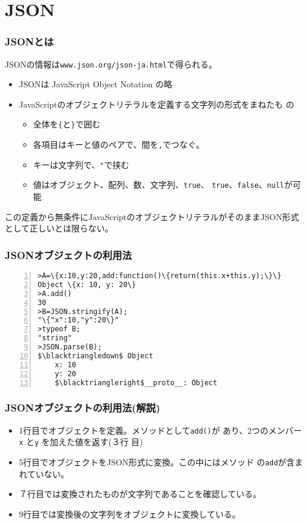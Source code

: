 
\renewcommand{\theFancyVerbLine}{\footnotesize\arabic{FancyVerbLine}}

\frame{\maketitle}
\section{JSON}
\begin{frame}[containsverbatim]
 \frametitle{JSONとは}
 JSONの情報は\texttt{www.json.org/json-ja.html}で得られる。
 \begin{itemize}
  \item  JSONは JavaScript Object Notation の略
  \item JavaScriptのオブジェクトリテラルを定義する文字列の形式をまねたも
				の
				\begin{itemize}
				 \item 全体を\texttt{\{}と\texttt{\}}で囲む
				 \item 各項目はキーと値のペアで、間を\texttt{,}でつなぐ。
				 \item キーは文字列で、\texttt{"}で挟む%
				 \item 値はオブジェクト、配列、数、文字列、\texttt{true}、
							 \texttt{true}、\texttt{false}、\texttt{null}が可能
				\end{itemize}
 \end{itemize}
 この定義から無条件にJavaScriptのオブジェクトリテラルがそのままJSON形式
 として正しいとは限らない。
\end{frame}
\begin{frame}[containsverbatim]
 \frametitle{JSONオブジェクトの利用法}
\begin{Verbatim}[numbers=left, fontsize=\scriptsize,numbersep=1pt,
	commandchars=\\\{\},
	codes={\catcode`$=3\catcode`^=7}]
>A=\{x:10,y:20,add:function()\{return(this.x+this.y);\}\}
Object \{x: 10, y: 20\}
>A.add()
30
>B=JSON.stringify(A);
"\{"x":10,"y":20\}"
>typeof B;
"string"
>JSON.parse(B);
$\blacktriangledown$ Object
	x: 10
	y: 20
	$\blacktriangleright$__proto__: Object
\end{Verbatim}
\end{frame}
\begin{frame}[containsverbatim]
 \frametitle{JSONオブジェクトの利用法(解説)}
\begin{itemize}
 \item 1行目でオブジェクトを定義。メソッドとして\Verb+add()+が
			 あり、2つのメンバー\Verb+x+ と\Verb+y+ を加えた値を返す(３行
			 目)
 \item 5行目でオブジェクトをJSON形式に変換。この中にはメソッド
			 の\Verb+add+が含まれていない。
 \item ７行目では変換されたものが文字列であることを確認している。
 \item 9行目では変換後の文字列をオブジェクトに変換している。
\end{itemize}
\end{frame}
